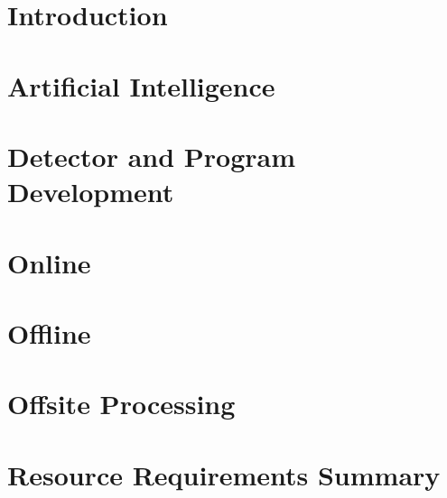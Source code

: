 \documentclass[12pt,twoside]{article}
\begin{document}
\linenumbers




\setcounter{page}{1}



\tableofcontents


\renewcommand{\thepage}{\arabic{page}}

\section {Introduction}
\label{sec:introduction}


\section {Artificial Intelligence} %
\label{sec:ai}


\section {Detector and Program Development}
\label{sec:detector_development}


\section {Online}
\label{sec:online}



\section {Offline}
\label{sec:offline}


\section {Offsite Processing}
\label{sec:offsite}


\section {Resource Requirements Summary}
\label{sec:resources}





%

%

\listoftodos[To Do]



\end{document}

